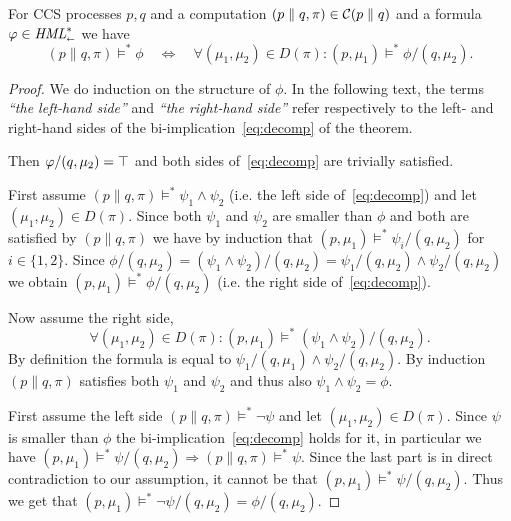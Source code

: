 \begin{theorem}\label{thm:decomposition}
    For CCS processes $p,q$ and a computation $(p \parallel q, \pi)\in \mathcal{C}(p\parallel q)$
    and a formula $\varphi \in \textit{HML}_\shortleftarrow^*$ we have
    \begin{equation}\label{eq:decomp}
        (p\parallel q, \pi) \vDash^* \phi
        \quad \Leftrightarrow \quad
        \forall (\mu_1,\mu_2) \in D(\pi) : (p,\mu_1) \vDash^* \phi/(q,\mu_2).
    \end{equation}
\end{theorem}
\begin{proof}
    We do induction on the structure of $\phi$. In the following text, the terms
    {\em ``the left-hand side''} and {\em ``the right-hand side''} refer respectively
    to the left- and right-hand sides
    of the bi-implication~\eqref{eq:decomp} of the theorem.

     Then $\varphi/(q, \mu_2) = \top$ and both sides
    of~\eqref{eq:decomp} are trivially satisfied.



    \ltr First assume $(p\parallel q, \pi)
    \vDash^* \psi_1 \land \psi_2$ (i.e. the left side of~\eqref{eq:decomp})
    and let $(\mu_1,\mu_2)\in D(\pi)$.
    Since both $\psi_1$ and $\psi_2$ are smaller than $\phi$ and both are satisfied by
    $(p\parallel q, \pi)$ we have by induction that $(p,\mu_1) \vDash^* \psi_i/(q, \mu_2)$
    for $i\in\{1,2\}$. Since $\phi/(q,\mu_2) = (\psi_1 \land \psi_2)/(q,\mu_2) =
    \psi_1 / (q, \mu_2) \land \psi_2 / (q,\mu_2)$ we obtain $(p,\mu_1) \vDash^*
    \phi/(q,\mu_2)$ (i.e. the right side of~\eqref{eq:decomp}).

    \rtl Now assume the right side, 
    \[
        \forall (\mu_1,\mu_2)\in D(\pi) : (p,\mu_1)
        \vDash^* (\psi_1 \land \psi_2)/(q, \mu_2).
    \] 
    By definition the formula is equal
    to $\psi_1/(q,\mu_1) \land \psi_2/(q,\mu_2)$. By induction \mbox{$(p\parallel q, \pi)$}
    satisfies both $\psi_1$ and $\psi_2$ and thus also $\psi_1 \land \psi_2 = \phi$.



    \ltr First assume the left side $(p\parallel q, \pi) \vDash^* \neg\psi$ and
    let $(\mu_1,\mu_2) \in D(\pi)$. Since $\psi$ is smaller than $\phi$ the
    bi-implication~\eqref{eq:decomp} holds for it, in particular we have $(p,\mu_1)
    \vDash^* \psi/(q,\mu_2) \Rightarrow (p \parallel q, \pi) \vDash^* \psi$. Since the
    last part is in direct contradiction to our assumption, it cannot be that
    $(p,\mu_1) \vDash^* \psi/(q,\mu_2)$. Thus we get that $(p,\mu_1) \vDash^*
    \neg \psi/(q,\mu_2) = \phi/(q,\mu_2)$.


\end{proof}
